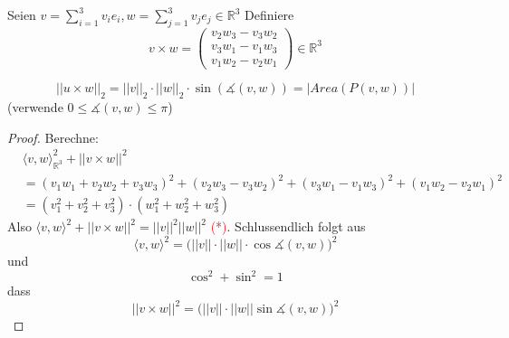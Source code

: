 \documentclass[../main.tex]{subfiles}
\begin{document}
\begin{einschub}
    Seien $v = \sum \limits_{i=1}^3 v_ie_i, w = \sum \limits_{j=1}^3 v_je_j \in \mathbb{R}^3$ 
    Definiere
    $$v\times w = \begin{pmatrix}
        v_2w_3 -v_3w_2 \\
        v_3w_1 -v_1w_3 \\
        v_1w_2 -v_2w_1
    \end{pmatrix} \in \mathbb{R}^3$$

    \begin{lemma}
        $$||u\times w ||_2 = ||v||_2 \cdot ||w||_2 \cdot \sin(\measuredangle (v,w)) = |Area(P(v,w))|$$(verwende $0 \le \measuredangle (v,w) \le \pi$)
    \end{lemma}
    \begin{proof}
        Berechne:
        \begin{align*}
            &\langle v,w \rangle _{\mathbb{R}^3}^2 + ||v\times w ||^2 \\
            &= (v_1w_1+v_2w_2+v_3w_3)^2+(v_2w_3-v_3w_2)^2+(v_3w_1-v_1w_3)^2+(v_1w_2-v_2w_1)^2 \\
            &= (v_1^2+v_2^2+v_3^2) \cdot (w_1^2+w_2^2+w_3^2)
        \end{align*}
        Also $\langle v,w\rangle ^2 + ||v\times w ||^2 = ||v||^2||w||^2$ \textcolor{red}{(*)}.
        Schlussendlich folgt aus $$\langle v,w\rangle^2=\big(||v||\cdot||w||\cdot \cos \measuredangle (v,w)\big)^2$$
        und $$\cos^2 + \sin^2 = 1$$dass $$||v\times w||^2 = \big(||v||\cdot||w||\sin \measuredangle(v,w) \big)^2$$ 
    \end{proof}
\end{einschub}
\end{document}
